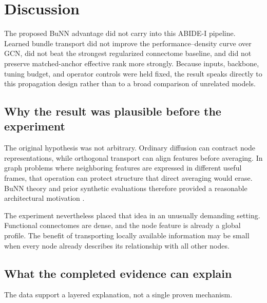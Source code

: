 \documentclass[11pt,a4paper]{article}
\begin{document}
\section{Discussion}

The proposed BuNN advantage did not carry into this ABIDE-I pipeline. Learned
bundle transport did not improve the performance--density curve over GCN,
did not beat the strongest regularized connectome baseline, and did not
preserve matched-anchor effective rank more strongly. Because inputs,
backbone, tuning budget, and operator controls were held fixed, the result
speaks directly to this propagation design rather than to a broad comparison
of unrelated models.

\subsection{Why the result was plausible before the experiment}

The original hypothesis was not arbitrary. Ordinary diffusion can contract
node representations, while orthogonal transport can align features before
averaging. In graph problems where neighboring features are expressed in
different useful frames, that operation can protect structure that direct
averaging would erase. BuNN theory and prior synthetic evaluations therefore
provided a reasonable architectural motivation \cite{bamberger2025bundle}.

The experiment nevertheless placed that idea in an unusually demanding
setting. Functional connectomes are dense, and the node feature is already a
global profile. The benefit of transporting locally available information may
be small when every node already describes its relationship with all other
nodes.

\subsection{What the completed evidence can explain}

The data support a layered explanation, not a single proven mechanism.
\end{document}
